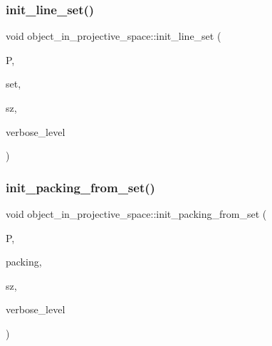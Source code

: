 \subsubsection{\texorpdfstring{init\+\_\+line\+\_\+set()}{init\_line\_set()}}
{\footnotesize\ttfamily void object\+\_\+in\+\_\+projective\+\_\+space\+::init\+\_\+line\+\_\+set (\begin{DoxyParamCaption}\item[{\mbox{\hyperlink{classprojective__space}{projective\+\_\+space}} $\ast$}]{P,  }\item[{\mbox{\hyperlink{galois_8h_a09fddde158a3a20bd2dcadb609de11dc}{I\+NT}} $\ast$}]{set,  }\item[{\mbox{\hyperlink{galois_8h_a09fddde158a3a20bd2dcadb609de11dc}{I\+NT}}}]{sz,  }\item[{\mbox{\hyperlink{galois_8h_a09fddde158a3a20bd2dcadb609de11dc}{I\+NT}}}]{verbose\+\_\+level }\end{DoxyParamCaption})}

\mbox{\label{classobject__in__projective__space_a085f606728855cecf404108ed051bec7}} 
\subsubsection{\texorpdfstring{init\+\_\+packing\+\_\+from\+\_\+set()}{init\_packing\_from\_set()}}
{\footnotesize\ttfamily void object\+\_\+in\+\_\+projective\+\_\+space\+::init\+\_\+packing\+\_\+from\+\_\+set (\begin{DoxyParamCaption}\item[{\mbox{\hyperlink{classprojective__space}{projective\+\_\+space}} $\ast$}]{P,  }\item[{\mbox{\hyperlink{galois_8h_a09fddde158a3a20bd2dcadb609de11dc}{I\+NT}} $\ast$}]{packing,  }\item[{\mbox{\hyperlink{galois_8h_a09fddde158a3a20bd2dcadb609de11dc}{I\+NT}}}]{sz,  }\item[{\mbox{\hyperlink{galois_8h_a09fddde158a3a20bd2dcadb609de11dc}{I\+NT}}}]{verbose\+\_\+level }\end{DoxyParamCaption})}

